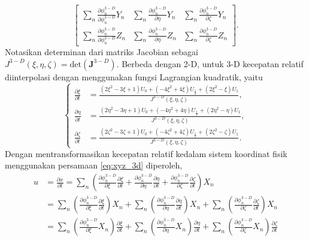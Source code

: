 \begin{spacing}{1.5}
\begin{equation*}
\begin{bmatrix}
			\sum_n\frac{\partial \phi_n^{3-D}}{\partial \phi_n^{3-D}}Y_n & \sum_n\frac{\partial \phi_n^{3-D}}{\partial \eta}Y_n & \sum_n\frac{\partial \phi_n^{3-D}}{\partial \zeta}Y_n \\
			\sum_n\frac{\partial \phi_n^{3-D}}{\partial \phi_n^{3-D}}Z_n & \sum_n\frac{\partial \phi_n^{3-D}}{\partial \eta}Z_n & \sum_n\frac{\partial \phi_n^{3-D}}{\partial \zeta}Z_n
		\end{bmatrix}.
	\end{equation*}
	Notasikan determinan dari matriks Jacobian sebagai $J^{3-D}(\xi,\eta,\zeta)=\text{det}(\textbf{J}^{3-D})$. Berbeda dengan 2-D, untuk 3-D kecepatan relatif diinterpolasi dengan menggunakan fungsi Lagrangian kuadratik, yaitu
	\begin{equation}
		\begin{cases}
			\frac{\partial \xi}{\partial t}&=\frac{(2\xi^2-3\xi+1)U_0+(-4\xi^2+4\xi)U_\frac{1}{2}+(2\xi^2-\xi)U_1}{J^{3-D}(\xi,\eta,\zeta)},\\
			\frac{\partial \eta}{\partial t}&=\frac{(2\eta^2-3\eta+1)U_0+(-4\eta^2+4\eta)U_\frac{1}{2}+(2\eta^2-\eta)U_1}{J^{3-D}(\xi,\eta,\zeta)},\\
			\frac{\partial \zeta}{\partial t}&=\frac{(2\zeta^2-3\zeta+1)U_0+(-4\zeta^2+4\zeta)U_\frac{1}{2}+(2\zeta^2-\zeta)U_1}{J^{3-D}(\xi,\eta,\zeta)}.
		\end{cases}
	\end{equation}
	Dengan mentransformasikan kecepatan relatif kedalam sistem koordinat fisik menggunakan persamaan \ref{eq:xyz_3d} diperoleh,
	\begin{equation*}
		\begin{aligned}
			u &= \frac{\partial x}{\partial t} = \sum_n \left(\frac{\partial \phi_n^{3-D}}{\partial \xi}\frac{\partial \xi}{\partial t}+\frac{\partial \phi_n^{3-D}}{\partial \eta}\frac{\partial \eta}{\partial t}+\frac{\partial \phi_n^{3-D}}{\partial \zeta}\frac{\partial \zeta}{\partial t}\right)X_n \\
			&= \sum_n \left(\frac{\partial \phi_n^{3-D}}{\partial \xi}\frac{\partial \xi}{\partial t}\right)X_n + \sum_n \left(\frac{\partial \phi_n^{3-D}}{\partial \eta}\frac{\partial \eta}{\partial t}\right)X_n + \sum_n \left(\frac{\partial \phi_n^{3-D}}{\partial \zeta}\frac{\partial \zeta}{\partial t}\right)X_n \\
			&= \sum_n \left(\frac{\partial \phi_n^{3-D}}{\partial \xi}X_n\right)\frac{\partial \xi}{\partial t} + \sum_n \left(\frac{\partial \phi_n^{3-D}}{\partial \eta}X_n\right)\frac{\partial \eta}{\partial t} + \sum_n \left(\frac{\partial \phi_n^{3-D}}{\partial \zeta}X_n\right)\frac{\partial \zeta}{\partial t}\\

\end{aligned}
\end{equation*}
\end{spacing}
